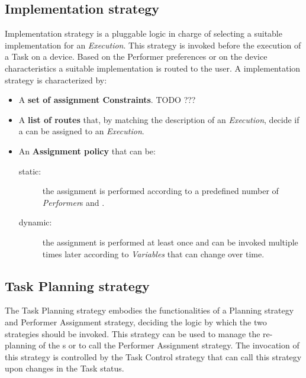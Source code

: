 \subsection{\utask{} Implementation strategy}
\utask{} Implementation strategy is a pluggable logic in charge of selecting a
suitable \utask{} implementation for an \emph{Execution}. This strategy is invoked
before the execution of a Task on a device. Based on the Performer preferences
or on the device characteristics a suitable \utask{} implementation is routed to
the user. A \utask{} implementation strategy is characterized by:
\begin{itemize}
    \item A \textbf{set of assignment Constraints}. TODO ???

    \item A \textbf{list of routes} that, by matching the description of an
    \emph{Execution}, decide if a \utask{} can be assigned to an \emph{Execution}.

    \item An \textbf{Assignment policy} that can be:
        \begin{description}
            \item[static:] the assignment is performed according to a predefined
            number of \emph{Performer}s and \utask{}.
            \item[dynamic:] the assignment is performed at least once and can be
            invoked multiple times later according to \emph{Variables} that can
            change over time.
        \end{description}
\end{itemize}



\subsection{Task Planning strategy}
The Task Planning strategy embodies the functionalities of a \utask{} Planning
strategy and Performer Assignment strategy, deciding the logic by which the
two strategies should be invoked. This strategy can be used to manage the
re-planning of the \utask{}s or to call the Performer Assignment strategy. The
invocation of this strategy is controlled by the Task Control strategy that can
call this strategy upon changes in the Task status.





